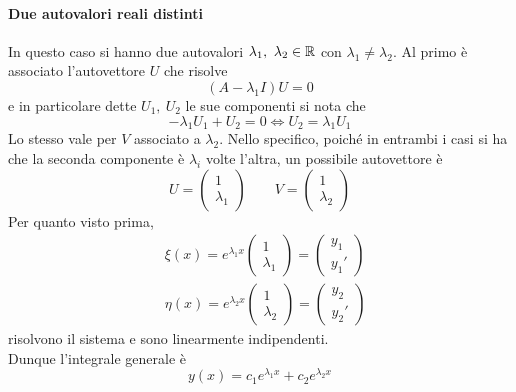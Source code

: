 \paragraph{Due autovalori reali distinti} In questo caso si hanno due autovalori $\lambda_1,\ \lambda_2 \in \mathbb{R}$ con $\lambda_1\neq \lambda_2$. Al primo è associato l'autovettore $U$ che risolve
\begin{equation*}
    (A- \lambda_1 I)U=0
\end{equation*}
e in particolare dette $U_1,\ U_2$ le sue componenti si nota che
\begin{equation*}
    -\lambda_1 U_1 + U_2 =0 \iff U_2 = \lambda_1 U_1
\end{equation*}
Lo stesso vale per $V$ associato a $\lambda_2$. Nello specifico, poiché in entrambi i casi si ha che la seconda componente è $\lambda_i$ volte l'altra, un possibile autovettore è
\begin{equation*}
    U=\begin{pmatrix}
        1\\
        \lambda_1
    \end{pmatrix} \qquad
    V=\begin{pmatrix}
        1\\
        \lambda_2
    \end{pmatrix}
\end{equation*}
Per quanto visto prima, 
\begin{align}
    &\xi(x)=e^{\lambda_1 x} \begin{pmatrix}
        1\\
        \lambda_1
    \end{pmatrix}=\begin{pmatrix}
        y_1\\
        y_1'
    \end{pmatrix}\\ 
    &\eta(x)= e^{\lambda_2 x} \begin{pmatrix}
        1\\
        \lambda_2
    \end{pmatrix}=\begin{pmatrix}
        y_2\\
        y_2'
        \end{pmatrix}
\end{align}
risolvono il sistema e sono linearmente indipendenti.\\
Dunque l'integrale generale è \begin{equation*}
    y(x)=c_1e^{\lambda_1 x} + c_2 e^{\lambda_2 x}
\end{equation*}
